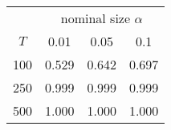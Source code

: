 % 
\begin{tabular}{cccc}
  \hline
  & \multicolumn{3}{c}{nominal size $\alpha$} \\
 $T$ & 0.01 & 0.05 & 0.1 \\
 \hline
100 & 0.529 & 0.642 & 0.697 \\ 
  250 & 0.999 & 0.999 & 0.999 \\ 
  500 & 1.000 & 1.000 & 1.000 \\ 
   \hline
\end{tabular}
